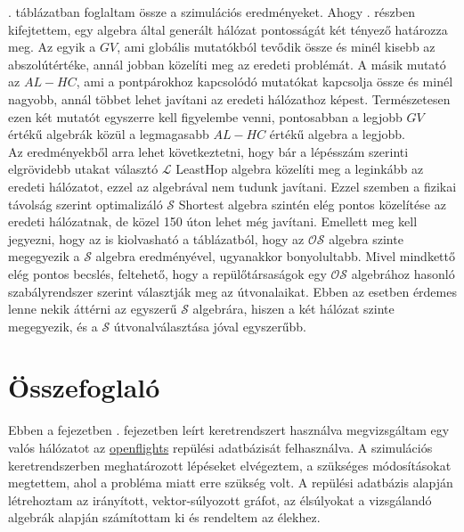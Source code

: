   . táblázatban foglaltam össze a szimulációs eredményeket. Ahogy . részben kifejtettem, egy algebra által generált hálózat pontosságát két tényező határozza meg. Az egyik a $GV$, ami globális mutatókból tevődik össze és minél kisebb az abszolútértéke, annál jobban közelíti meg az eredeti problémát. A másik mutató az $AL-HC$, ami a pontpárokhoz kapcsolódó mutatókat kapcsolja össze és minél nagyobb, annál többet lehet javítani az eredeti hálózathoz képest. Természetesen ezen két mutatót egyszerre kell figyelembe venni, pontosabban a legjobb $GV$ értékű algebrák közül a legmagasabb $AL-HC$ értékű algebra a legjobb.\\

  Az eredményekből arra lehet következtetni, hogy bár a lépésszám szerinti elgrövidebb utakat választó $\mathcal{L}$ LeastHop algebra közelíti meg a leginkább az eredeti hálózatot, ezzel az algebrával nem tudunk javítani. Ezzel szemben a fizikai távolság szerint optimalizáló $\mathcal{S}$ Shortest algebra szintén elég pontos közelítése az eredeti hálózatnak, de közel 150 úton lehet még javítani. Emellett meg kell jegyezni, hogy az is kiolvasható a táblázatból, hogy az $\mathcal{OS}$ algebra szinte megegyezik a $\mathcal{S}$ algebra eredményével, ugyanakkor bonyolultabb. Mivel mindkettő elég pontos becslés, feltehető, hogy a repülőtársaságok egy $\mathcal{OS}$ algebrához hasonló szabályrendszer szerint választják meg az útvonalaikat. Ebben az esetben érdemes lenne nekik áttérni az egyszerű $\mathcal{S}$ algebrára, hiszen a két hálózat szinte megegyezik, és a $\mathcal{S}$ útvonalválasztása jóval egyszerűbb.

  \section{Összefoglaló}
  Ebben a fejezetben . fejezetben leírt keretrendszert használva megvizsgáltam egy valós hálózatot az \href{http://openflights.org/}{openflights} repülési adatbázisát felhasználva. A szimulációs keretrendszerben meghatározott lépéseket elvégeztem, a szükséges módosításokat megtettem, ahol a probléma miatt erre szükség volt. A repülési adatbázis alapján létrehoztam az irányított, vektor-súlyozott gráfot, az élsúlyokat a vizsgálandó algebrák alapján számítottam ki és rendeltem az élekhez.\\

